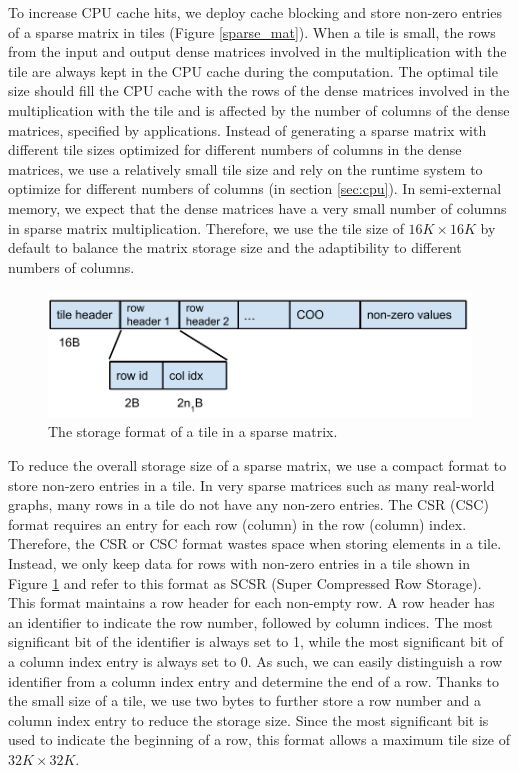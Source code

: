 To increase CPU cache hits, we deploy cache blocking \cite{Im04} and store
non-zero entries of a sparse matrix in tiles (Figure \ref{sparse_mat}).
When a tile is small, the rows from the input and output dense matrices
involved in the multiplication with the tile are always kept in the CPU cache
during the computation. The optimal tile size should fill the CPU cache
with the rows of the dense matrices involved in the multiplication with
the tile and is affected by the number of columns of the dense matrices,
specified by applications. Instead of generating a sparse matrix with
different tile sizes optimized for different numbers of columns in the dense
matrices, we use a relatively small tile size and rely on the runtime system
to optimize for different numbers of columns (in section \ref{sec:cpu}).
In semi-external memory, we expect that the dense matrices have a very small
number of columns in sparse matrix multiplication. Therefore, we
use the tile size of $16K \times 16K$ by default to balance the matrix storage
size and the adaptibility to different numbers of columns.

\begin{figure}
\centering
\includegraphics[scale=0.5]{./tile_format.pdf}
\caption{The storage format of a tile in a sparse matrix.}
\label{tile_format}
\end{figure}

To reduce the overall storage size of a sparse matrix, we use a compact format
to store non-zero entries in a tile. In very sparse matrices such as
many real-world graphs, many rows in a tile do not have any non-zero entries.
The CSR (CSC) format requires an entry for each row (column) in the row
(column) index. Therefore, the CSR or CSC format wastes space when storing elements
in a tile. Instead, we only keep data for rows with non-zero entries in a tile
shown in Figure \ref{tile_format} and refer to this format as SCSR (Super
Compressed Row Storage). This format maintains a row header for each non-empty
row. A row header has an identifier to indicate the row number, followed by
column indices. 
The most significant bit of the identifier is always set to 1, while the most
significant bit of a column index entry is always set to 0. As such, we can easily
distinguish a row identifier from a column index entry and determine the end
of a row. Thanks to the small size of a tile, we use two bytes to further store a row
number and a column index entry to reduce the storage size. Since the most
significant bit is used to indicate the beginning of a row, this format allows
a maximum tile size of $32K \times 32K$.

